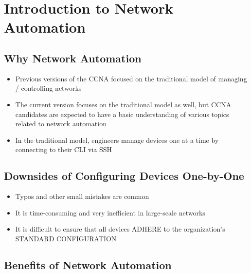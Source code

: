 \chapter{Introduction to Network
Automation}\label{introduction-to-network-automation}

\section{Why Network Automation}\label{why-network-automation}

\begin{itemize}
\tightlist
\item
  Previous versions of the CCNA focused on the traditional model of
  managing / controlling networks
\item
  The current version focuses on the traditional model as well, but CCNA
  candidates are expected to have a basic understanding of various
  topics related to network automation
\item
  In the traditional model, engineers manage devices one at a time by
  connecting to their CLI via SSH
\end{itemize}

\section{Downsides of Configuring Devices
One-by-One}\label{downsides-of-configuring-devices-one-by-one}

\begin{itemize}
\tightlist
\item
  Typos and other small mistakes are common
\item
  It is time-consuming and very inefficient in large-scale networks
\item
  It is difficult to ensure that all devices ADHERE to the
  organization's STANDARD CONFIGURATION
\end{itemize}

\section{Benefits of Network
Automation}\label{benefits-of-network-automation}

